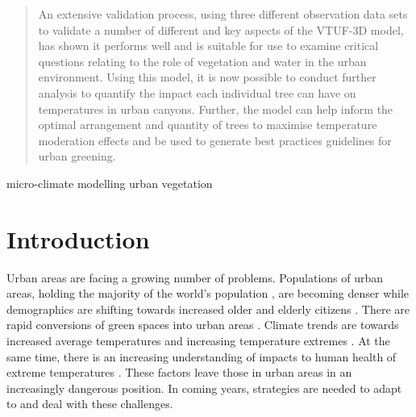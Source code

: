 \documentclass[final,3p,times,authoryear]{elsarticle}
\begin{document}
\begin{frontmatter}
\begin{abstract}

An extensive validation process, using three different observation data sets to validate a number of different and key aspects of the VTUF-3D model, has shown it performs well and is suitable for use to examine critical questions relating to the role of vegetation and water in the urban environment. Using this model, it is now possible to conduct further analysis to quantify the impact each individual tree can have on temperatures in urban canyons. Further, the model can help inform the optimal arrangement and quantity of trees to maximise temperature moderation effects and be used to generate best practices guidelines for urban greening.
\end{abstract}

\begin{keyword}
micro-climate modelling urban vegetation



\end{keyword}

\end{frontmatter}

\begin{table}[!t]   
\begin{framed}
\printnomenclature
%
\end{framed}
\end{table}





\section{Introduction}\label{sec:introduction}
Urban areas are facing a growing number of problems. Populations of urban areas, holding the majority of the world's population \citep{UNDESA2015,WHO2016}, are becoming denser while demographics are shifting towards increased older and elderly citizens \citep{ABS2008}. There are rapid conversions of green spaces into urban areas \citep{DSE2002,Coutts2007}. Climate trends are towards increased average temperatures and increasing temperature extremes \citep{Alexander2009,IPCC2013a}. At the same time, there is an increasing understanding of impacts to human health of extreme temperatures \citep{Katsouyanni1993,Nicholls2008,Loughnan2010}. These factors leave those in urban areas in an increasingly dangerous position. In coming years, strategies are needed to adapt to and deal with these challenges.
\end{document}
